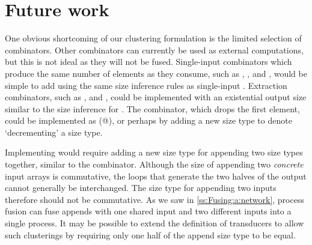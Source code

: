 

\section{Future work}


One obvious shortcoming of our clustering formulation is the limited selection of combinators.
Other combinators can currently be used as external computations, but this is not ideal as they will not be fused.
Single-input combinators which produce the same number of elements as they consume, such as \Hs@postscanl@, \Hs@prescanl@, and \Hs@indexed@, would be simple to add using the same size inference rules as single-input \Hs@map@.
Extraction combinators, such as \Hs@slice@, \Hs@take@ and \Hs@drop@, could be implemented with an existential output size similar to the size inference for \Hs@filter@.
The \Hs@tail@ combinator, which drops the first element, could be implemented as (@), or perhaps by adding a new size type to denote `decrementing' a size type.

Implementing \Hs@append@ would require adding a new size type for appending two size types together, similar to the \Hs@cross@ combinator.
Although the size of appending two \emph{concrete} input arrays is commutative, the loops that generate the two halves of the output cannot generally be interchanged.
The size type for appending two inputs therefore should not be commutative.
As we saw in \cref{ss:Fusing:a:network}, process fusion can fuse appends with one shared input and two different inputs into a single process.
It may be possible to extend the definition of transducers to allow such clusterings by requiring only one half of the append size type to be equal.

